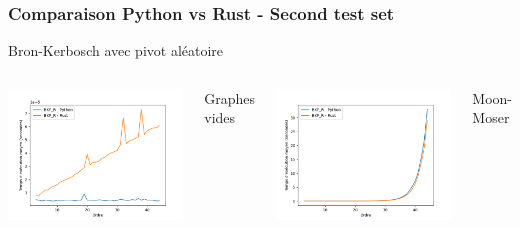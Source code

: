 \documentclass{beamer}
\begin{document}
\begin{frame}
\frametitle{Comparaison Python vs Rust - Second test set}
Bron-Kerbosch avec pivot aléatoire
  \begin{columns}
    \centering
    \includegraphics[width=\textwidth]{images/total_BKP_R_new_pyrust_pivot_empty_plot.png}
    \caption{Graphes vides}
    \centering
    \includegraphics[width=\textwidth]{images/total_BKP_R_new_pyrust_pivot_turan_plot.png}
    \caption{Moon-Moser}
    \centering

\end{columns}
\end{frame}
\end{document}
